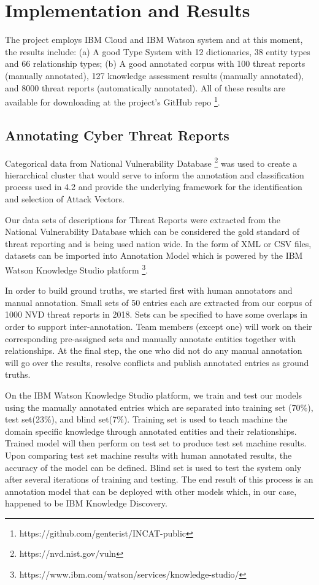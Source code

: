 \documentclass[conference]{IEEEtran}
\begin{document}
\section{Implementation and Results}
The project employs IBM Cloud and IBM Watson system and at this moment, the results include: (a) A good Type System with 12 dictionaries, 38 entity types and 66 relationship types; (b) A good annotated corpus with 100 threat reports (manually annotated), 127 knowledge assessment results (manually annotated), and 8000 threat reports (automatically annotated). All of these results are available for downloading at the project's GitHub repo \footnote{https://github.com/genterist/INCAT-public}.

\subsection{Annotating Cyber Threat Reports} 
Categorical data from National Vulnerability Database \footnote{https://nvd.nist.gov/vuln} was used to create a hierarchical cluster that would serve to inform the annotation and classification process used in 4.2 and provide the underlying framework for the identification and selection of Attack Vectors.

Our data sets of descriptions for Threat Reports were extracted from the National Vulnerability Database which can be considered the gold standard of threat reporting and is being used nation wide. In the form of XML or CSV files, datasets can be imported into Annotation Model which is powered by the IBM Watson Knowledge Studio platform \footnote{https://www.ibm.com/watson/services/knowledge-studio/}.

In order to build ground truths, we started first with human annotators and manual annotation. Small sets of 50 entries each are extracted from our corpus of 1000 NVD threat reports in 2018. Sets can be specified to have some overlaps in order to support inter-annotation. Team members (except one) will work on their corresponding pre-assigned sets and manually annotate entities together with relationships. At the final step, the one who did not do any manual annotation will go over the results, resolve conflicts and publish annotated entries as ground truths.

On the IBM Watson Knowledge Studio platform, we train and test our models using the manually annotated entries which are separated into training set (70\%), test set(23\%), and blind set(7\%). Training set is used to teach machine the domain specific knowledge through annotated entities and their relationships. Trained model will then perform on test set to produce test set machine results. Upon comparing test set machine results with human annotated results, the accuracy of the model can be defined. Blind set is used to test the system only after several iterations of training and testing. The end result of this process is an annotation model that can be deployed with other models which, in our case, happened to be IBM Knowledge Discovery.
\end{document}
